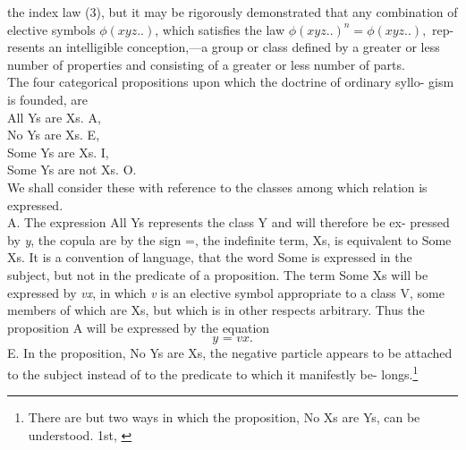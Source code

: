 \documentclass{article}
\begin{document}
{the index law (3), but it may be rigorously demonstrated that any combination
of elective symbols $\phi(\textit{xyz}. .)$, which satisfies the law $\phi(\textit{xyz}. .)^n = \phi(\textit{xyz}. .),$ rep-
resents an intelligible conception,—a group or class defined by a greater or less
number of properties and consisting of a greater or less number of parts.\\ \vspace{.005in}
\hspace{.2in}
    The four categorical propositions upon which the doctrine of ordinary syllo-
gism is founded, are\\ \vspace{.005in}
\hspace{.4in}
        All Ys are Xs.            A,\\ \vspace{.005in}
\hspace{.4in}
        No Ys are Xs.             E,\\ \vspace{.005in}
\hspace{.4in}
        Some Ys are Xs.           I,\\ \vspace{.1in}
\hspace{.4in}
        Some Ys are not Xs.       O.\\ \vspace{.005in}
We shall consider these with reference to the classes among which relation is
expressed.\\ \vspace{.005in}
\hspace{.2in} A. The expression All Ys represents the class Y and will therefore be ex-
pressed by \textit y, the copula are by the sign =, the indefinite term, Xs, is equivalent
to Some Xs. It is a convention of language, that the word Some is expressed in
the subject, but not in the predicate of a proposition. The term Some Xs will
be expressed by \textit {vx}, in which \textit v is an elective symbol appropriate to a class V,
some members of which are Xs, but which is in other respects arbitrary. Thus
the proposition A will be expressed by the equation
\begin{equation}\textit{y = vx.}\end{equation}
\hspace{.2in}E. In the proposition, No Ys are Xs, the negative particle appears to be
attached to the subject instead of to the predicate to which it manifestly be-
longs.\footnote[2]{\footnotesize{There are but two ways in which the proposition, No Xs are Ys, can be understood. 1st,
}}}
\end{document}
